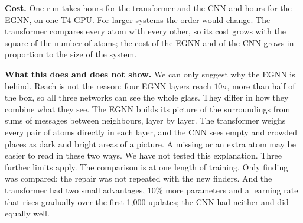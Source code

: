 \textbf{Cost.} One run takes  hours for the transformer and the CNN and  hours for the EGNN, on one T4 GPU. For larger systems the order would change. The transformer compares every atom with every other, so its cost grows with the square of the number of atoms; the cost of the EGNN and of the CNN grows in proportion to the size of the system.

\textbf{What this does and does not show.} We can only suggest why the EGNN is behind. Reach is not the reason: four EGNN layers reach $10\sigma$, more than half of the box, so all three networks can see the whole glass. They differ in how they combine what they see. The EGNN builds its picture of the surroundings from sums of messages between neighbours, layer by layer. The transformer weighs every pair of atoms directly in each layer, and the CNN sees empty and crowded places as dark and bright areas of a picture. A missing or an extra atom may be easier to read in these two ways. We have not tested this explanation. Three further limits apply. The comparison is at one length of training. Only finding was compared: the repair was not repeated with the new finders. And the transformer had two small advantages, 10\% more parameters and a learning rate that rises gradually over the first 1,000 updates; the CNN had neither and did equally well.
